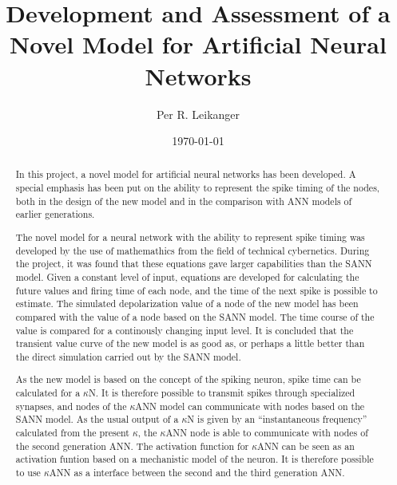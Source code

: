 \documentclass[b5paper,11 pt]{report}
\author{Per R. Leikanger}
\title{Development and Assessment of a Novel Model for Artificial Neural Networks}
\date{\today}
\begin{document}
   




\maketitle

\begin{abstract}
In this project, a novel model for artificial neural networks has been developed. 
A special emphasis has been put on the ability to represent the spike timing of the nodes, both in the design of the new model and in the comparison with ANN models of earlier generations.

The novel model for a neural network with the ability to represent spike timing was developed by the use of mathemathics from the field of technical cybernetics.
During the project, it was found that these equations gave larger capabilities than the SANN model. %
Given a constant level of input, equations are developed for calculating the future values and firing time of each node, and the time of the next spike is possible to estimate.
The simulated depolarization value of a node of the new model has been compared with the value of a node based on the SANN model.
The time course of the value is compared for a continously changing input level.
It is concluded that the transient value curve of the new model is as good as, or perhaps a little better than the direct simulation carried out by the SANN model.


 
As the new model is based on the concept of the spiking neuron, spike time can be calculated for a $\kappa$N.
It is therefore possible to transmit spikes through specialized synapses, and nodes of the $\kappa$ANN model can communicate with nodes based on the SANN model.
As the usual output of a $\kappa$N is given by an ``instantaneous frequency'' calculated from the present $\kappa$, the $\kappa$ANN node is able to communicate with nodes of the second generation ANN.
The activation function for $\kappa$ANN can be seen as an activation funtion based on a mechanistic model of the neuron.
It is therefore possible to use $\kappa$ANN as a interface between the second and the third generation ANN.

\end{abstract}
\end{document}
